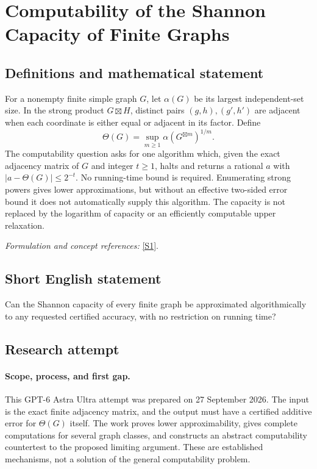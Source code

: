 \documentclass[11pt]{article}
\begin{document}
\section*{\texorpdfstring{Computability of the Shannon Capacity of Finite Graphs}{Computability of the Shannon Capacity of Finite Graphs}}\label{30006913}
\subsection{Definitions and mathematical statement}
For a nonempty finite simple graph $G$, let $\alpha(G)$ be its largest independent-set size. In the strong product $G\boxtimes H$, distinct pairs $(g,h),(g',h')$ are adjacent when each coordinate is either equal or adjacent in its factor. Define
\[
 \Theta(G)=\sup_{m\ge1}\alpha(G^{\boxtimes m})^{1/m}.
\]
The computability question asks for one algorithm which, given the exact adjacency matrix of $G$ and integer $t\ge1$, halts and returns a rational $a$ with $|a-\Theta(G)|\le2^{-t}$. No running-time bound is required. Enumerating strong powers gives lower approximations, but without an effective two-sided error bound it does not automatically supply this algorithm. The capacity is not replaced by the logarithm of capacity or an efficiently computable upper relaxation.
\par\smallskip\textit{Formulation and concept references:} \href{https://arxiv.org/html/2010.06873v3}{[S1]}.

\subsection{Short English statement}
Can the Shannon capacity of every finite graph be approximated algorithmically to any requested certified accuracy, with no restriction on running time?
\subsection{Research attempt}
\paragraph{Scope, process, and first gap.}
This GPT-6 Astra Ultra attempt was prepared on 27 September 2026. The input is the exact finite adjacency matrix, and the output must have a certified additive error for $\Theta(G)$ itself. The work proves lower approximability, gives complete computations for several graph classes, and constructs an abstract computability countertest to the proposed limiting argument. These are established mechanisms, not a solution of the general computability problem.
\end{document}
